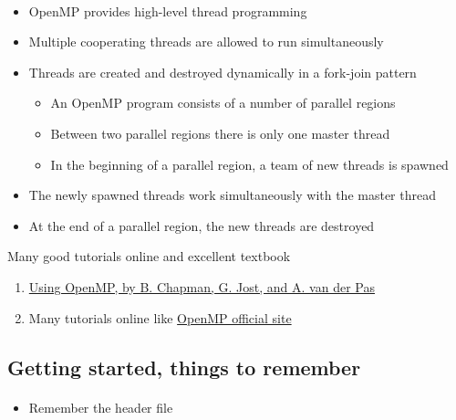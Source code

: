 \paragraph{}
\begin{itemize}
\item OpenMP provides high-level thread programming

\item Multiple cooperating threads are allowed to run simultaneously

\item Threads are created and destroyed dynamically in a fork-join pattern
\begin{itemize}

   \item An OpenMP program consists of a number of parallel regions

   \item Between two parallel regions there is only one master thread

   \item In the beginning of a parallel region, a team of new threads is spawned

\end{itemize}

\noindent
  \item The newly spawned threads work simultaneously with the master thread

  \item At the end of a parallel region, the new threads are destroyed
\end{itemize}

\noindent
Many good tutorials online and excellent textbook
\begin{enumerate}
\item \href{{http://mitpress.mit.edu/books/using-openmp}}{Using OpenMP, by B. Chapman, G. Jost, and A. van der Pas}

\item Many tutorials online like \href{{http://www.openmp.org}}{OpenMP official site}
\end{enumerate}

\noindent



\subsection*{Getting started, things to remember}

\paragraph{}
\begin{itemize}
 \item Remember the header file 
\end{itemize}

